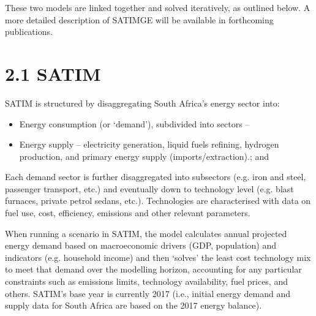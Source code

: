 \documentclass[letterpaper,10pt,english]{jupyterBook}
\begin{document}
\sphinxAtStartPar
These two models are linked together and solved iteratively, as outlined below. A more detailed description of SATIMGE will be available in forthcoming publications.


\section{2.1 SATIM}
\label{\detokenize{02SATIMGE:satim}}
\sphinxAtStartPar
{}

\sphinxAtStartPar
SATIM is structured by disaggregating South Africa’s energy sector into:
\begin{itemize}
\item {} 
\sphinxAtStartPar
Energy consumption (or ‘demand’), subdivided into sectors – 

\item {} 
\sphinxAtStartPar
Energy supply – electricity generation, liquid fuels refining, hydrogen production, and primary energy supply (imports/extraction).; and

\end{itemize}

\sphinxAtStartPar
Each demand sector is further disaggregated into subsectors (e.g. iron and steel, passenger transport, etc.) and eventually down to technology level (e.g. blast furnaces, private petrol sedans, etc.). Technologies are characterised with data on fuel use, cost, efficiency, emissions and other relevant parameters.

\sphinxAtStartPar
When running a scenario in SATIM, the model calculates annual projected energy demand based on macroeconomic drivers (GDP, population) and indicators (e.g. household income) and then ‘solves’ the least cost technology mix to meet that demand over the modelling horizon, accounting for any particular constraints such as emissions limits, technology availability, fuel prices, and others. SATIM’s base year is currently 2017 (i.e., initial energy demand and supply data for South Africa are based on the 2017 energy balance).
\end{document}
